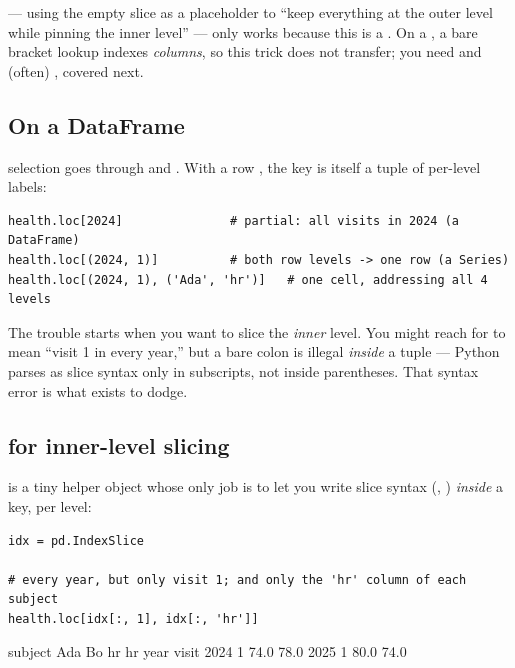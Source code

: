 \documentclass[11pt]{article}
\begin{document}
\begin{pitfall}
 --- using the empty slice \code{:} as a placeholder to ``keep everything at the outer level while pinning the inner level'' --- only works because this is a . On a , a bare bracket lookup  indexes \emph{columns}, so this trick does not transfer; you need  and (often) , covered next.
\end{pitfall}

\subsection{On a DataFrame}

 selection goes through  and . With a row , the  key is itself a tuple of per-level labels:

\begin{lstlisting}
health.loc[2024]               # partial: all visits in 2024 (a DataFrame)
health.loc[(2024, 1)]          # both row levels -> one row (a Series)
health.loc[(2024, 1), ('Ada', 'hr')]   # one cell, addressing all 4 levels
\end{lstlisting}

The trouble starts when you want to slice the \emph{inner} level. You might reach for  to mean ``visit 1 in every year,'' but a bare colon is illegal \emph{inside} a tuple --- Python parses \code{:} as slice syntax only in subscripts, not inside parentheses. That syntax error is what  exists to dodge.

\subsection{ for inner-level slicing}

 is a tiny helper object whose only job is to let you write slice syntax (\code{:}, ) \emph{inside} a  key, per level:

\begin{lstlisting}
idx = pd.IndexSlice

# every year, but only visit 1; and only the 'hr' column of each subject
health.loc[idx[:, 1], idx[:, 'hr']]
\end{lstlisting}

\begin{outblock}
subject         Ada    Bo
                 hr    hr
year visit
2024 1         74.0  78.0
2025 1         80.0  74.0
\end{outblock}
\end{document}

